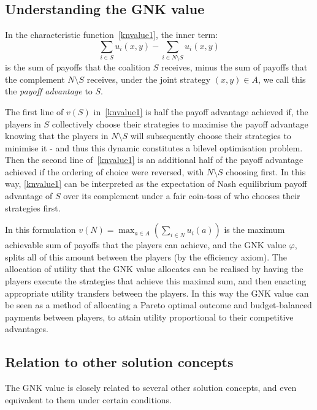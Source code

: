 \subsection{Understanding the GNK value}\label{the_value_def4}

In the characteristic function~\eqref{knvalue1}, the inner term:
\[
\sum_{i\in S} u_i(x,y) - \sum_{i\in N\setminus S} u_i(x,y)
\] 
is the sum of payoffs that the coalition $S$ receives, 
minus the sum of payoffs that the complement $N\setminus S$ receives, 
under the joint strategy $(x,y)\in A$, we call this the \textit{payoff advantage} to $S$.

The first line of $v(S)$ in~\eqref{knvalue1} is half the payoff advantage achieved if, the players in $S$ collectively choose their strategies to maximise the payoff advantage knowing that the players in $N\setminus S$ will subsequently choose their strategies to minimise it - and thus this dynamic constitutes a bilevel optimisation problem.
Then the second line of~\eqref{knvalue1} is an additional half of the payoff advantage achieved if the ordering of choice were reversed, with $N\setminus S$ choosing first.
In this way, \eqref{knvalue1} can be interpreted as the expectation of Nash equilibrium payoff advantage of $S$ over its complement under a fair coin-toss of who chooses their strategies first.

In this formulation $v(N) = \max_{a\in A} (\sum_{i\in N} u_i(a))$ is the maximum achievable sum of payoffs that the players can achieve, and the GNK value $\varphi$, splits all of this amount between the players (by the efficiency axiom).
The allocation of utility that the GNK value allocates can be realised by having the players execute the strategies that achieve this maximal sum, and then enacting appropriate utility transfers between the players.
In this way the GNK value can be seen as a method of allocating a Pareto optimal outcome and budget-balanced payments between players, to attain utility proportional to their competitive advantages.

\subsection{Relation to other solution concepts}\label{relating_to_the_old}

The GNK value is closely related to several other solution concepts, and even equivalent to them under certain conditions.

